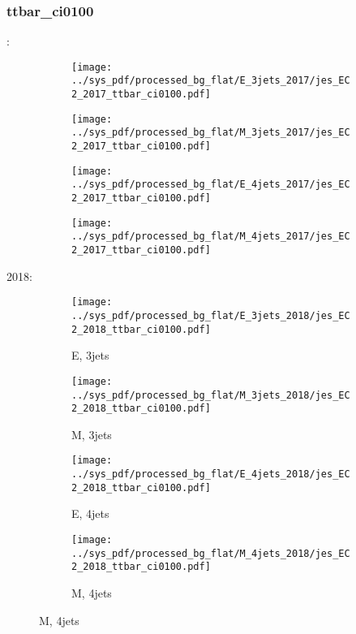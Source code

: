 \documentclass{beamer}
\begin{document}
\begin{frame}
\frametitle{ttbar_ci0100}
\fontsize{5}{1}:
\begin{figure}
\centering
\begin{subfigure}[b]{0.24\textwidth}
\texttt{[image: ../sys\_pdf/processed\_bg\_flat/E\_3jets\_2017/jes\_EC2\_2017\_ttbar\_ci0100.pdf]}
\end{subfigure}
\begin{subfigure}[b]{0.24\textwidth}
\texttt{[image: ../sys\_pdf/processed\_bg\_flat/M\_3jets\_2017/jes\_EC2\_2017\_ttbar\_ci0100.pdf]}
\end{subfigure}
\begin{subfigure}[b]{0.24\textwidth}
\texttt{[image: ../sys\_pdf/processed\_bg\_flat/E\_4jets\_2017/jes\_EC2\_2017\_ttbar\_ci0100.pdf]}
\end{subfigure}
\begin{subfigure}[b]{0.24\textwidth}
\texttt{[image: ../sys\_pdf/processed\_bg\_flat/M\_4jets\_2017/jes\_EC2\_2017\_ttbar\_ci0100.pdf]}
\end{subfigure}
\end{figure}
2018:
\begin{figure}
\centering
\begin{subfigure}[b]{0.24\textwidth}
\texttt{[image: ../sys\_pdf/processed\_bg\_flat/E\_3jets\_2018/jes\_EC2\_2018\_ttbar\_ci0100.pdf]}
\captionsetup{font=tiny}
\caption{E, 3jets}
\end{subfigure}
\begin{subfigure}[b]{0.24\textwidth}
\texttt{[image: ../sys\_pdf/processed\_bg\_flat/M\_3jets\_2018/jes\_EC2\_2018\_ttbar\_ci0100.pdf]}
\captionsetup{font=tiny}
\caption{M, 3jets}
\end{subfigure}
\begin{subfigure}[b]{0.24\textwidth}
\texttt{[image: ../sys\_pdf/processed\_bg\_flat/E\_4jets\_2018/jes\_EC2\_2018\_ttbar\_ci0100.pdf]}
\captionsetup{font=tiny}
\caption{E, 4jets}
\end{subfigure}
\begin{subfigure}[b]{0.24\textwidth}
\texttt{[image: ../sys\_pdf/processed\_bg\_flat/M\_4jets\_2018/jes\_EC2\_2018\_ttbar\_ci0100.pdf]}
\captionsetup{font=tiny}
\caption{M, 4jets}
\end{subfigure}
\end{figure}
\end{frame}
\end{document}
